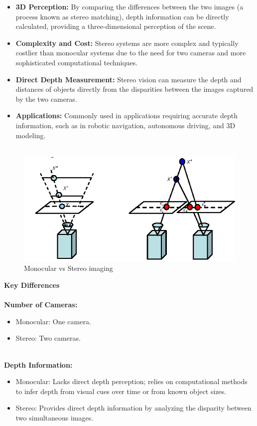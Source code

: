 \documentclass[22pt]{report}
\begin{document}
        \begin{itemize}
            \item \textbf{3D Perception:} By comparing the differences between the two images (a process known as stereo matching), depth information can be directly calculated, providing a three-dimensional perception of the scene.
            \item \textbf{Complexity and Cost:} Stereo systems are more complex and typically costlier than monocular systems due to the need for two cameras and more sophisticated computational techniques.
            \item \textbf{Direct Depth Measurement:} Stereo vision can measure the depth and distances of objects directly from the disparities between the images captured by the two cameras.
            \item \textbf{Applications:} Commonly used in applications requiring accurate depth information, such as in robotic navigation, autonomous driving, and 3D modeling.\\\\
        \end{itemize}

        \begin{figure}[h]
            \centering
            \includegraphics[width=0.5\linewidth]{Images/MonocularVsStereo.png}
            \caption{Monocular vs Stereo imaging}
        \end{figure}
        \textbf{Key Differences}\\\\
        \textbf{Number of Cameras:}
        \begin{itemize}
            \item Monocular: One camera.
            \item Stereo: Two cameras.
        \end{itemize}
        
        \textbf{\\Depth Information:}
        \begin{itemize}
            \item Monocular: Lacks direct depth perception; relies on computational methods to infer depth from visual cues over time or from known object sizes.
            \item Stereo: Provides direct depth information by analyzing the disparity between two simultaneous images.
        \end{itemize}
        
\end{document}
